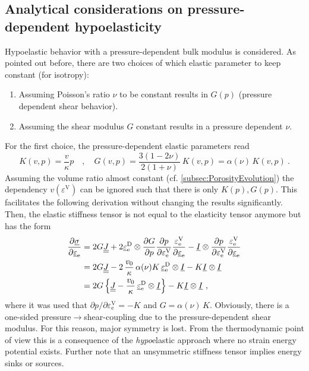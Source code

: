 \documentclass[paper=a4, twoside, pagesize]{scrartcl}
\newcommand{\tensor}[1]{\underline{#1}}
\newcommand{\tensorf}[1]{\underline{\underline{#1}}}
\newcommand{\D}{\text{D}}
\newcommand{\e}{\text{e}}
\newcommand{\dyad}{\otimes}
\begin{document}
\subsection{Analytical considerations on pressure-dependent hypoelasticity}
\label{subsec:AppHypoelasticity}

Hypoelastic behavior with a pressure-dependent bulk modulus is considered. As pointed out before, there are two choices of which elastic parameter to keep constant (for isotropy):
\begin{enumerate}
    \item Assuming Poisson's ratio $\nu$ to be constant results in $G(p)$ (pressure dependent shear behavior).
    \item Assuming the shear modulus $G$ constant results in a pressure dependent $\nu$.
\end{enumerate}
For the first choice, the pressure-dependent elastic parameters read
\begin{equation}
  K(v,p) = \frac{v}{\kappa}p \quad,\quad G(v,p)=\frac{3(1-2\nu)}{2(1+\nu)}\,K(v,p) = \alpha(\nu) \,K(v,p) \ .
\end{equation}
Assuming the volume ratio almost constant (cf. \autoref{subsec:PorosityEvolution}) the dependency $v(\varepsilon^\text{V})$ can be ignored such that there is only $K(p), G(p)$. This facilitates the following derivation without changing the results significantly.
Then, the elastic stiffness tensor is not equal to the elasticity tensor anymore but has the form
\begin{align}
  \frac{\partial \tensor\sigma}{\partial \tensor\varepsilon_\e} &= 2G \tensorf J + 2\tensor\varepsilon_\e^\D \dyad  \frac{\partial G}{\partial p} \frac{\partial p}{\partial \varepsilon_\e^\text{V}} \frac{\varepsilon_\e^\text{V}}{\partial\tensor\varepsilon_\e} - \tensor I \dyad\frac{\partial p}{\partial \varepsilon_\e^\text{V}} \frac{\varepsilon_\e^\text{V}}{\partial\tensor\varepsilon_\e} \\
  &= 
  2G \tensorf J - 2\,\frac{v_0}{\kappa}\,\alpha(\nu) K\, \tensor\varepsilon_\e^\D \dyad \tensor I  - K \tensor I \dyad \tensor I \notag \\
  &= 
  2G \left\{\tensorf J - \frac{v_0}{\kappa}\, \tensor\varepsilon_\e^\D \dyad \tensor I \right\}  - K \tensor I \dyad \tensor I \ ,
\end{align}
where it was used that ${\partial p}/{\partial \varepsilon_\e^\text{V}}=-K$ and $G=\alpha(\nu)\,K$. Obviously, there is a one-sided pressure$\rightarrow$shear-coupling due to the pressure-dependent shear modulus. For this reason, major symmetry is lost. From the thermodynamic point of view this is a consequence of the \emph{hypo}elastic approach where no strain energy potential exists. Further note that an unsymmetric stiffness tensor implies energy sinks or sources.
\end{document}
